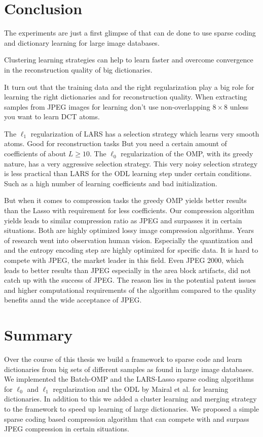 \section{Conclusion}
The experiments are just a first glimpse of that can de done to use sparse
coding and dictionary learning for large image databases.

Clustering learning strategies can help to learn faster and overcome
convergence in the reconstruction quality of big dictionaries.


It turn out that the training data and the right 
regularization play a big role for learning the right dictionaries and
for reconstruction quality. When extracting samples from JPEG images for
learning don't use non-overlapping $8 \times 8$ unless you want to learn DCT
atoms. 

The $\ell_1$ regularization of LARS has a selection strategy
which learns very smooth atoms. Good for reconstruction tasks 
But you need a certain amount of coefficients of about $L \ge 10$.
The $\ell_0$ regularization of the OMP, with its greedy nature, has a very
aggressive selection strategy. 
This very noisy selection strategy is less practical
than LARS for the ODL learning step under certain conditions. Such as a high
number of learning coefficients and bad initialization.

But when it comes to compression tasks the greedy OMP yields better results
than the Lasso with requirement for less coefficients. 
Our compression algorithm yields leads to similar compression ratio as JPEG
and surpasses it in certain situations. Both are highly optimized lossy image
compression algorithms.  Years of research went into observation human vision. 
Especially the quantization and and the entropy encoding step are highly
optimized for specific data. It is hard to compete with JPEG, the market leader
in this field.  Even JPEG 2000, which leads to better results than JPEG
especially in the area block artifacts, did not catch up with the success of
JPEG.  The reason lies in the potential patent issues and higher computational
requirements of the algorithm compared to the quality benefits annd the wide
acceptance of JPEG.



\section{Summary}
Over the course of this thesis we build a framework to sparse code and learn
dictionaries from big sets of different samples as found in large image
databases. We implemented the Batch-OMP and the LARS-Lasso sparse coding
algorithms for $\ell_0$ and $\ell_1$ regularization and the ODL by Mairal et
al. for learning dictionaries. 
In addition to this we added a cluster learning and merging strategy to the
framework to speed up learning of large dictionaries.
We proposed a simple sparse coding based compression algorithm that can compete
with and surpass JPEG compression in certain situations.


